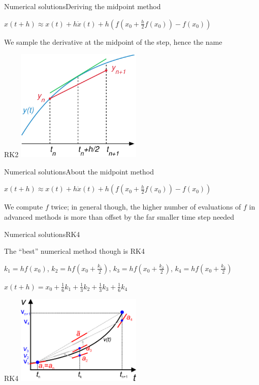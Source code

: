\documentclass{beamer}
\begin{document}
\begin{slide}{Numerical solutions}{Deriving the midpoint method}{
\item $x(t+h) \approx x(t) + h \dot x(t) + h(f(x_0 + \frac{h}{2} f(x_0)) - f(x_0))$
\item We sample the derivative at the midpoint of the step, hence the name
}\end{slide}

\begin{frame}{RK2}
\center
\includegraphics[width=6cm]{Pics/Midpoint_method.png}
\end{frame}

\begin{slide}{Numerical solutions}{About the midpoint method}{
\item $x(t+h) \approx x(t) + h \dot x(t) + h(f(x_0 + \frac{h}{2} f(x_0)) - f(x_0))$
\item We compute $f$ twice; in general though, the higher number of evaluations of $f$ in advanced methods is more than offset by the far smaller time step needed
}\end{slide}

\begin{slide}{Numerical solutions}{RK4}{
\item The ``best'' numerical method though is RK4
\item $k_1 = h f(x_0)$, $k_2 = h f(x_0 + \frac{k_1}{2})$, $k_3 = h f(x_0 + \frac{k_2}{2})$, $k_4 = h f(x_0 + \frac{k_3}{2})$
\item $x(t+h) = x_0 + \frac{1}{6} k_1 + \frac{1}{3} k_2 + \frac{1}{3} k_3 + \frac{1}{6} k_4$
}\end{slide}

\begin{frame}{RK4}
\center
\includegraphics[width=6cm]{Pics/RK4.png}
\end{frame}
\end{document}
